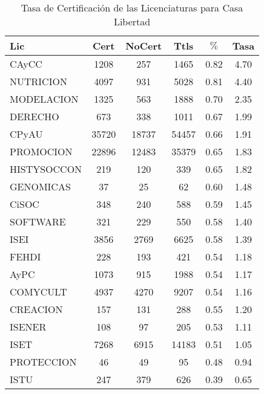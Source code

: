 \documentclass[12pt]{article}
\begin{document}
\begin{table}[h]
\centering
\begin{tabular}{|l|cc|c|cc|}\hline\hline
Lic & Cert & NoCert & Ttls & $\%$ & Tasa \\\hline\hline
CAyCC & 1208 & 257 & 1465 & 0.82 & 4.70 \\
NUTRICION & 4097 & 931 & 5028 & 0.81 & 4.40 \\\hline\hline
MODELACION & 1325 & 563 & 1888 & 0.70 & 2.35 \\
DERECHO & 673 & 338 & 1011 & 0.67 & 1.99 \\
CPyAU & 35720 & 18737 & 54457 & 0.66 & 1.91 \\
PROMOCION & 22896 & 12483 & 35379 & 0.65 & 1.83 \\
HISTYSOCCON & 219 & 120 & 339 & 0.65 & 1.82 \\\hline\hline
GENOMICAS & 37 & 25 & 62 & 0.60 & 1.48 \\
CiSOC & 348 & 240 & 588 & 0.59 & 1.45 \\
SOFTWARE & 321 & 229 & 550 & 0.58 & 1.40 \\
ISEI & 3856 & 2769 & 6625 & 0.58 & 1.39 \\
FEHDI & 228 & 193 & 421 & 0.54 & 1.18 \\
AyPC & 1073 & 915 & 1988 & 0.54 & 1.17 \\
COMYCULT & 4937 & 4270 & 9207 & 0.54 & 1.16 \\
CREACION & 157 & 131 & 288 & 0.55 & 1.20 \\
ISENER & 108 & 97 & 205 & 0.53 & 1.11 \\
ISET & 7268 & 6915 & 14183 & 0.51 & 1.05 \\\hline\hline
PROTECCION & 46 & 49 & 95 & 0.48 & 0.94 \\
ISTU & 247 & 379 & 626 & 0.39 & 0.65 \\\hline\hline
\end{tabular}
\caption{Tasa de Certificación de las Licenciaturas para Casa Libertad}
\end{table}
\end{document}
